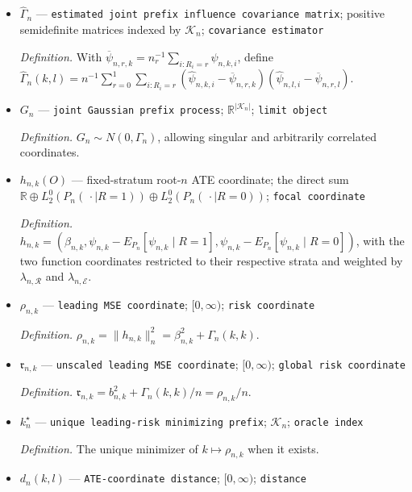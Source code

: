 \documentclass{article}
\begin{document}
\begin{itemize}
  \par\smallskip\noindent\emph{Definition.} \(\Gamma_n(k,l)=\sum_{r=0}^1P_n(R=r)\operatorname{Cov}_{P_n}\{\psi_{n,k}(O),\psi_{n,l}(O)\mid R=r\}\).
  \item \(\widehat\Gamma_n\) --- \texttt{estimated joint prefix influence covariance matrix}; positive semidefinite matrices indexed by \(\mathcal K_n\); \texttt{covariance estimator}
  \par\smallskip\noindent\emph{Definition.} With \(\overline\psi_{n,r,k}=n_r^{-1}\sum_{i:R_i=r}\widehat\psi_{n,k,i}\), define \(\widehat\Gamma_n(k,l)=n^{-1}\sum_{r=0}^1\sum_{i:R_i=r}(\widehat\psi_{n,k,i}-\overline\psi_{n,r,k})(\widehat\psi_{n,l,i}-\overline\psi_{n,r,l})\).
  \item \(G_n\) --- \texttt{joint Gaussian prefix process}; \(\mathbb R^{|\mathcal K_n|}\); \texttt{limit object}
  \par\smallskip\noindent\emph{Definition.} \(G_n\sim N(0,\Gamma_n)\), allowing singular and arbitrarily correlated coordinates.
  \item \(h_{n,k}(O)\) --- fixed-stratum root-\(n\) ATE coordinate; the direct sum \(\mathbb R\oplus L_2^0(P_n(\,\cdot\mid R=1))\oplus L_2^0(P_n(\,\cdot\mid R=0))\); \texttt{focal coordinate}
  \par\smallskip\noindent\emph{Definition.} \(h_{n,k}=(\beta_{n,k},\psi_{n,k}-E_{P_n}[\psi_{n,k}\mid R=1],\psi_{n,k}-E_{P_n}[\psi_{n,k}\mid R=0])\), with the two function coordinates restricted to their respective strata and weighted by \(\lambda_{n,\mathcal R}\) and \(\lambda_{n,\mathcal E}\).
  \item \(\rho_{n,k}\) --- \texttt{leading MSE coordinate}; \([0,\infty)\); \texttt{risk coordinate}
  \par\smallskip\noindent\emph{Definition.} \(\rho_{n,k}=\|h_{n,k}\|_n^2=\beta_{n,k}^2+\Gamma_n(k,k)\).
  \item \(\mathfrak r_{n,k}\) --- \texttt{unscaled leading MSE coordinate}; \([0,\infty)\); \texttt{global risk coordinate}
  \par\smallskip\noindent\emph{Definition.} \(\mathfrak r_{n,k}=b_{n,k}^2+\Gamma_n(k,k)/n=\rho_{n,k}/n\).
  \item \(k_n^{\star}\) --- \texttt{unique leading-\allowbreak{}risk minimizing prefix}; \(\mathcal K_n\); \texttt{oracle index}
  \par\smallskip\noindent\emph{Definition.} The unique minimizer of \(k\mapsto\rho_{n,k}\) when it exists.
  \item \(d_n(k,l)\) --- \texttt{ATE-\allowbreak{}coordinate distance}; \([0,\infty)\); \texttt{distance}

\end{itemize}
\end{document}
